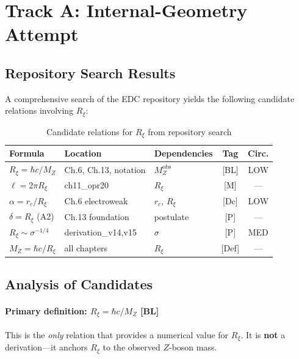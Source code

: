 \documentclass[11pt,a4paper]{article}
\newcommand{\MZ}{M_Z}
\newcommand{\Rxi}{R_\xi}
\newcommand{\re}{r_e}
\newcommand{\obs}{\text{obs}}
\begin{document}
\section{Track A: Internal-Geometry Attempt}
\label{sec:track-a}

\subsection{Repository Search Results}

A comprehensive search of the EDC repository yields the following
candidate relations involving $\Rxi$:

\begin{table}[ht]
\centering
\caption{Candidate relations for $\Rxi$ from repository search}
\label{tab:candidates}
\small
\begin{tabular}{@{}p{3.5cm}p{4cm}p{2.5cm}cc@{}}
\toprule
\textbf{Formula} & \textbf{Location} & \textbf{Dependencies} & \textbf{Tag} & \textbf{Circ.} \\
\midrule
$\Rxi = \hbar c / \MZ$ & Ch.6, Ch.13, notation & $\MZ^{\obs}$ & [BL] & LOW \\
$\ell = 2\pi \Rxi$ & ch11\_opr20 & $\Rxi$ & [M] & --- \\
$\alpha = \re/\Rxi$ & Ch.6 electroweak & $\re$, $\Rxi$ & [Dc] & LOW \\
$\delta = \Rxi$ (A2) & Ch.13 foundation & postulate & [P] & --- \\
$\Rxi \sim \sigma^{-1/4}$ & derivation\_v14,v15 & $\sigma$ & [P] & MED \\
$\MZ = \hbar c / \Rxi$ & all chapters & $\Rxi$ & [Def] & --- \\
\bottomrule
\end{tabular}
\end{table}

\subsection{Analysis of Candidates}

\paragraph{Primary definition: $\Rxi = \hbar c/\MZ$ [BL]}

This is the \emph{only} relation that provides a numerical value for $\Rxi$.
It is \textbf{not} a derivation---it anchors $\Rxi$ to the observed $Z$-boson mass.
\end{document}
